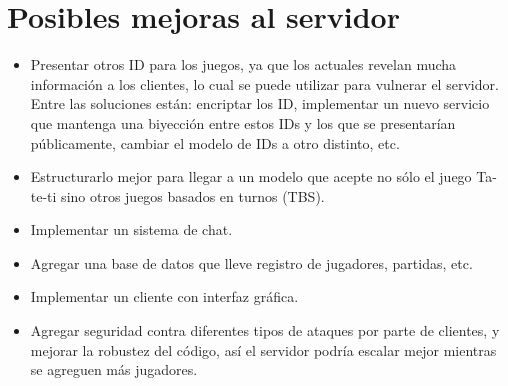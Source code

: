 \documentclass[a4paper]{report}
\begin{document}
\section*{Posibles mejoras al servidor}
\begin{itemize}
	\item Presentar otros ID para los juegos, ya que los actuales revelan
	mucha información a los clientes, lo cual se puede utilizar para
	vulnerar el servidor. Entre las soluciones están: encriptar los ID,
	implementar un nuevo servicio que mantenga una biyección entre estos
	IDs y los que se presentarían públicamente, cambiar el modelo de IDs
	a otro distinto, etc.
	\item Estructurarlo mejor para llegar a un modelo que acepte no sólo
	el juego Ta-te-ti sino otros juegos basados en turnos (TBS).
	\item Implementar un sistema de chat.
	\item Agregar una base de datos que lleve registro de jugadores, 
	partidas, etc.
	\item Implementar un cliente con interfaz gráfica.
	\item Agregar seguridad contra diferentes tipos de ataques por parte
	de clientes, y mejorar la robustez del código, así el servidor podría
	escalar mejor mientras se agreguen más jugadores.
\end{itemize}
\end{document}
